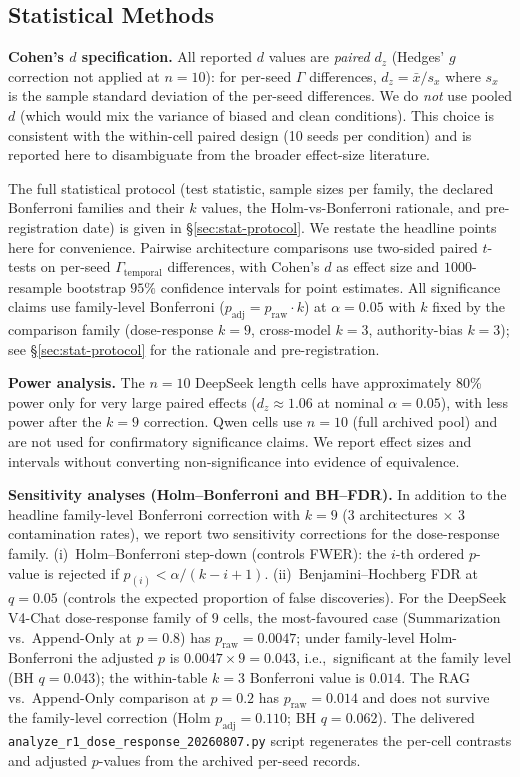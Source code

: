 \documentclass[11pt]{article}
\begin{document}
\subsection{Statistical Methods}

\textbf{Cohen's $d$ specification.} All reported $d$ values are \emph{paired} $d_z$ (Hedges' $g$ correction not applied at $n=10$): for per-seed $\Gamma$ differences, $d_z = \bar{x} / s_x$ where $s_x$ is the sample standard deviation of the per-seed differences. We do \emph{not} use pooled $d$ (which would mix the variance of biased and clean conditions). This choice is consistent with the within-cell paired design (10 seeds per condition) and is reported here to disambiguate from the broader effect-size literature.

The full statistical protocol (test statistic, sample sizes per family, the declared Bonferroni families and their $k$ values, the Holm-vs-Bonferroni rationale, and pre-registration date) is given in \S\ref{sec:stat-protocol}. We restate the headline points here for convenience. Pairwise architecture comparisons use two-sided paired $t$-tests on per-seed $\Gamma_{\text{temporal}}$ differences, with Cohen's $d$ as effect size and $1000$-resample bootstrap $95\%$ confidence intervals for point estimates. All significance claims use family-level Bonferroni ($p_{\text{adj}} = p_{\text{raw}} \cdot k$) at $\alpha = 0.05$ with $k$ fixed by the comparison family (dose-response $k=9$, cross-model $k=3$, authority-bias $k=3$); see \S\ref{sec:stat-protocol} for the rationale and pre-registration.

\textbf{Power analysis.} The $n=10$ DeepSeek length cells have approximately 80\% power only for very large paired effects ($d_z\approx1.06$ at nominal $\alpha=0.05$), with less power after the $k=9$ correction. Qwen cells use $n=10$ (full archived pool) and are not used for confirmatory significance claims. We report effect sizes and intervals without converting non-significance into evidence of equivalence.

\noindent\textbf{Sensitivity analyses (Holm--Bonferroni and BH--FDR).} In addition to the headline family-level Bonferroni correction with $k=9$ (3 architectures $\times$ 3 contamination rates), we report two sensitivity corrections for the dose-response family. (i)~Holm--Bonferroni step-down (controls FWER): the $i$-th ordered $p$-value is rejected if $p_{(i)} < \alpha / (k - i + 1)$. (ii)~Benjamini--Hochberg FDR at $q=0.05$ (controls the expected proportion of false discoveries). For the DeepSeek V4-Chat dose-response family of $9$ cells, the most-favoured case (Summarization vs.\ Append-Only at $p=0.8$) has $p_{\text{raw}}=0.0047$; under family-level Holm-Bonferroni the adjusted $p$ is $0.0047 \times 9 = 0.043$, i.e.,\ significant at the family level (BH $q = 0.043$); the within-table $k{=}3$ Bonferroni value is $0.014$. The RAG vs.\ Append-Only comparison at $p=0.2$ has $p_{\text{raw}}=0.014$ and does not survive the family-level correction (Holm $p_{\text{adj}}=0.110$; BH $q=0.062$). The delivered \texttt{analyze\_r1\_dose\_response\_20260807.py} script regenerates the per-cell contrasts and adjusted $p$-values from the archived per-seed records.
\end{document}
